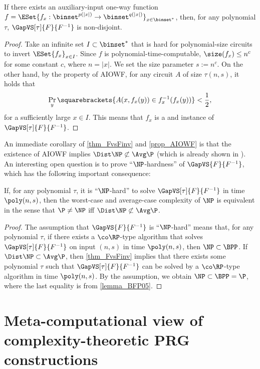 \documentclass{toc}
\begin{document}
\begin{proposition}
  \label{prop_AIOWF}
  If there exists an auxiliary-input one-way function
  $f = \ESet{ f_x : \binset^{p(|x|)} \to \binset^{q(|x|)} }_{x \in \binset^*}$,
  then,
  for any polynomial $\tau$,
  $\GapVS[\tau]{F}{F^{-1}}$ is non-disjoint.
\end{proposition}
\begin{proof}
  Take an infinite set $I \subset \binset^*$ that is hard for polynomial-size circuits to invert $\ESet{f_x}_{x \in I}$.
  Since $f$ is polynomial-time-computable, $\size(f_x) \le n^c$ for some constant $c$,
  where $n = |x|$.
  We set the size parameter $s := n^c$.
  On the other hand,
  by the property of AIOWF,
  for any circuit $A$ of size $\tau(n, s)$,
  it holds that
  $$\Pr_y \squarebrackets{ A(x, f_x(y)) \in f_x^{-1}(f_x(y)) } < \frac{1}{2},$$
  for a sufficiently large $x \in I$.
  This means that $f_x$ is a \Yes and \No instance of $\GapVS[\tau]{F}{F^{-1}}$.
\end{proof}

An immediate corollary of
\cref{thm_FvsFinv}
and
\cref{prop_AIOWF}
is that the existence of AIOWF implies $\Dist\NP \not\subset \Avg\P$
(which is already shown in \cite{Hirahara18_focs_conf}).
An interesting open question is to prove ``$\NP$-hardness'' of $\GapVS{F}{F^{-1}}$,
which has the following important consequence:
\begin{corollary}
  If,
  for any polynomial $\tau$,
  it is \textup{``}$\NP$-hard\textup{''} to solve $\GapVS[\tau]{F}{F^{-1}}$ in time $\poly(n, s)$,
  then
  the worst-case and average-case complexity of $\NP$ is equivalent
  in the sense that $\P \neq \NP$ iff $\Dist\NP \not\subset \Avg\P$.
\end{corollary}

\begin{proof}
  The assumption that
  $\GapVS{F}{F^{-1}}$
  is ``$\NP$-hard''
  means that, for any polynomial $\tau$,
  if there exists a $\co\RP$-type algorithm
  that solves $\GapVS[\tau]{F}{F^{-1}}$
  on input $(n, s)$ in time $\poly(n, s)$,
  then
  $\NP \subset \BPP$.
  If $\Dist\NP \subset \Avg\P$,
  then
  \cref{thm_FvsFinv}
  implies that
  there exists some polynomial $\tau$ such that
  $\GapVS[\tau]{F}{F^{-1}}$ can be solved by a $\co\RP$-type algorithm
  in time $\poly(n, s)$.
  By the assumption, we obtain $\NP \subset \BPP = \P$, where the last equality is from \cref{lemma_BFP05}.
\end{proof}

\section{Meta-computational view of complexity-theoretic PRG constructions}
\label{section_Genral}
\end{document}
